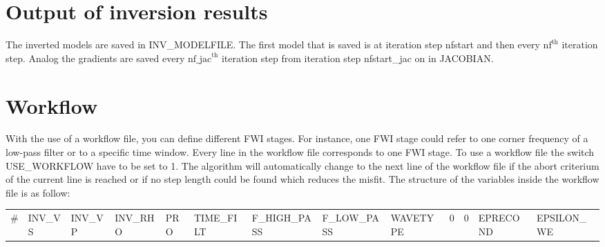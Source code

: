 \section{Output of inversion results}
\label{sec:Output_of_inversion_results_json}
{\color{blue}{\begin{verbatim}
"Output of inverted models" : "comment",
			"INV_MODELFILE" : "model/model_Test",
			"nfstart" : "1",
			"nf" : "1",

"Output of gradients" : "comment",
			"JACOBIAN" : "jacobian/jacobian_Test",
			"nfstart_jac" : "1",
			"nf_jac" : "1",
\end{verbatim}}}

The inverted models are saved in INV\_MODELFILE. The first model that is saved is at iteration step nfstart and then every $\mathrm{nf}^{\mathrm{th}}$ iteration step. Analog the gradients are saved every $\mathrm{nf\_jac}^{\mathrm{th}}$ iteration step from iteration step nfstart\_jac on in JACOBIAN. 

\section{Workflow}
\label{sec:workflow}
{\color{blue}{\begin{verbatim}
"Workflow" : "comment",
			"USE_WORKFLOW" : "1",
			"FILE_WORKFLOW" : "workflow.txt",
\end{verbatim}}}
{\color{red}{\begin{verbatim}
Default values are:
"USE_WORKFLOW" : "0"
\end{verbatim}}}
With the use of a workflow file, you can define different FWI stages. For instance, one FWI stage could refer to one corner frequency of a low-pass filter or to a specific time window. Every line in the workflow file corresponds to one FWI stage. To use a workflow file the switch USE\_WORKFLOW have to be set to 1.  The algorithm will automatically change to the next line of the workflow file if the abort criterium of the current line is reached or if no step length could be found which reduces the misfit. The structure of the variables inside the workflow file is as follow: \\

\noindent
\begin{tabular}{lllllllllllll}
\# & INV\_VS & INV\_VP & INV\_RHO & PRO & TIME\_FILT & F\_HIGH\_PASS & F\_LOW\_PASS & WAVETYPE & 0 & 0 & EPRECOND & EPSILON\_WE\\
\end{tabular}

